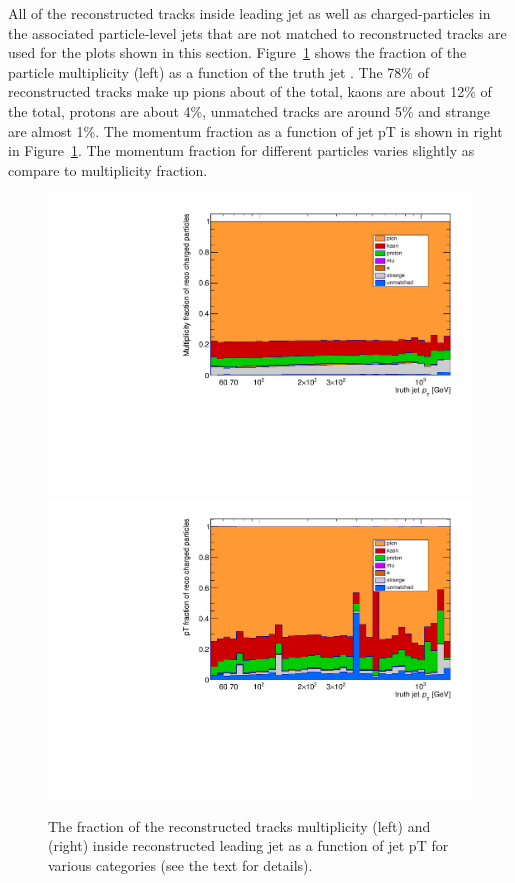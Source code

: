 All of the reconstructed tracks inside leading jet as well as charged-particles in the associated particle-level jets that are not matched to reconstructed tracks are used for the plots shown in this section. Figure~\ref{fig:fraction of charged particles in reco jet} shows the fraction of the particle multiplicity (left) as a function of the truth jet \pT. The 78\% of reconstructed tracks make up pions about of the total, kaons are about 12\% of the total, protons are about 4\%, unmatched tracks are around 5\% and strange are almost 1\%. The momentum fraction as a function of jet pT is shown in right in Figure~\ref{fig:fraction of charged particles in reco jet}. The momentum fraction for different particles varies slightly as compare to multiplicity fraction.

\begin{figure}
\centering
\includegraphics[scale=0.3, page=1]{figures/jet_comp_study_powheg_Tight_MultiplicityFraction.pdf}
\hspace{2mm}
\includegraphics[scale=0.3, page=1]{figures/jet_comp_study_powheg_Tight_pTFraction.pdf}
\caption {The fraction of the reconstructed tracks multiplicity (left) and \pT (right) inside reconstructed leading jet as a function of jet pT for various categories (see the text for details).}
\label{fig:fraction of charged particles in reco jet}
\end{figure}


